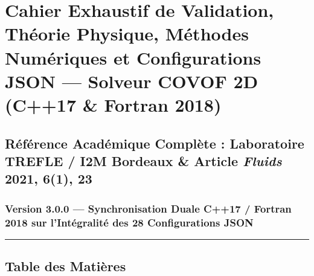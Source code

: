 \documentclass[
  10pt,
]{article}
\author{}
\date{}
\begin{document}
{
\setcounter{tocdepth}{3}
\tableofcontents
}
\section{Cahier Exhaustif de Validation, Théorie Physique, Méthodes
Numériques et Configurations JSON --- Solveur COVOF 2D (C++17 \& Fortran
2018)}\label{cahier-exhaustif-de-validation-thuxe9orie-physique-muxe9thodes-numuxe9riques-et-configurations-json-solveur-covof-2d-c17-fortran-2018}

\subsection{\texorpdfstring{Référence Académique Complète : Laboratoire
TREFLE / I2M Bordeaux \& Article \emph{Fluids} 2021, 6(1),
23}{Référence Académique Complète : Laboratoire TREFLE / I2M Bordeaux \& Article Fluids 2021, 6(1), 23}}\label{ruxe9fuxe9rence-acaduxe9mique-compluxe8te-laboratoire-trefle-i2m-bordeaux-article-fluids-2021-61-23}

\subsubsection{Version 3.0.0 --- Synchronisation Duale C++17 / Fortran
2018 sur l'Intégralité des 28 Configurations
JSON}\label{version-3.0.0-synchronisation-duale-c17-fortran-2018-sur-lintuxe9gralituxe9-des-28-configurations-json}

\begin{center}\rule{0.5\linewidth}{0.5pt}\end{center}

\subsection{Table des Matières}\label{table-des-matiuxe8res}
\end{document}
